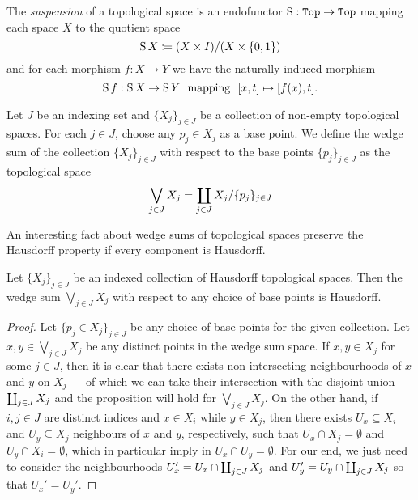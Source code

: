 \begin{definition}[Suspension]
    \label{def:suspension}
    The \emph{suspension} of a topological space is an endofunctor \(\operatorname{S}: {\texttt{Top}} \to
    {\texttt{Top}}\) mapping each space \(X\) to the quotient space
    \[
        \operatorname{S} X \coloneq (X \times I)/(X \times \{0, 1\})
    \]
    and for each morphism \(f: X \to Y\) we have the naturally induced morphism
    \[
        \Susp f: \Susp X \to \Susp Y\ \text{ mapping }\ [x, t] \mapsto [f(x), t].
    \]
\end{definition}


\begin{example}
    \label{exp:wedge-sum-space}
    Let \(J\) be an indexing set and \(\{X_j\}_{j \in J}\) be a collection of
    non-empty topological spaces. For each \(j \in J\), choose any \(p_j \in X_j\)
    as a base point. We define the wedge sum of the collection \(\{X_{j}\}_{j \in
    J}\) with respect to the base points \(\{p_{j}\}_{j \in J}\) as the topological
    space
    \[
        \bigvee_{j \in J} X_j = \coprod_{j \in J} X_j / \{p_{j}\}_{j \in J}
    \]
\end{example}

An interesting fact about wedge sums of topological spaces preserve the
Hausdorff property if every component is Hausdorff.

\begin{proposition}
    \label{prop:hausdorff-wedge-sum}
    Let \(\{X_{j}\}_{j \in J}\) be an indexed collection of Hausdorff topological
    spaces. Then the wedge sum \(\bigvee_{j \in J} X_j\) with respect to any choice
    of base points is Hausdorff.
\end{proposition}

\begin{proof}
    Let \(\{p_j \in X_j\}_{j \in J}\) be any choice of base points for the given
    collection. Let \(x, y \in \bigvee_{j \in J} X_j\) be any distinct points in the
    wedge sum space. If \(x, y \in X_j\) for some \(j \in J\), then it is clear that
    there exists non-intersecting neighbourhoods of \(x\) and \(y\) on \(X_j\) ---
    of which we can take their intersection with the disjoint union \(\coprod_{j \in
        J} X_j\) and the proposition will hold for \(\bigvee_{j \in J} X_j\). On the
    other hand, if \(i, j \in J\) are distinct indices and \(x \in X_i\) while \(y
    \in X_j\), then there exists \(U_x \subseteq X_i\) and \(U_y \subseteq X_j\)
    neighbours of \(x\) and \(y\), respectively, such that \(U_x \cap X_j =
    \emptyset\) and \(U_y \cap X_i = \emptyset\), which in particular imply in \(U_x
    \cap U_y= \emptyset\). For our end, we just need to consider the neighbourhoods
    \(U_x' = U_x \cap \coprod_{j \in J} X_j\) and \(U_y' = U_y \cap \coprod_{j \in J}
    X_j\) so that \(U_x' = U_y'\).
\end{proof}

